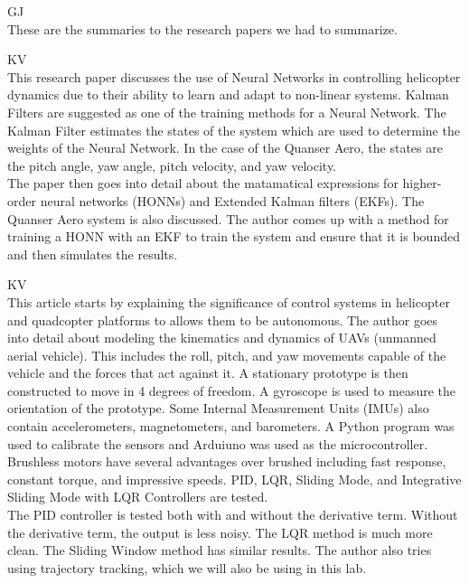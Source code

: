 \documentclass[fontsize=11pt, %
                             paper=letter, %
                             openany, %
                             captions=tableheading,
                             index=totoc,
                             hyperref]{labbook}
\begin{document}
\begin{addmargin}[0cm]{0cm}
GJ\\
These are the summaries to the research papers we had to summarize.


KV\\
This research paper \cite{Article1} discusses the use of Neural Networks in controlling helicopter dynamics due to their ability to learn and adapt to non-linear systems.  Kalman Filters are suggested as one of the training methods for a Neural Network.  The Kalman Filter estimates the states of the system which are used to determine the weights of the Neural Network.  In the case of the Quanser Aero, the states are the pitch angle, yaw angle, pitch velocity, and yaw velocity. 
\\The paper then goes into detail about the matamatical expressions for higher-order neural networks (HONNs) and Extended Kalman filters (EKFs).  The Quanser Aero system is also discussed.  The author comes up with a method for training a HONN with an EKF to train the system and ensure that it is bounded and then simulates the results.

KV\\
This article \cite{Article2} starts by explaining the significance of control systems in helicopter and quadcopter platforms to allows them to be autonomous.  The author goes into detail about modeling the kinematics and dynamics of UAVs (unmanned aerial vehicle). This includes the roll, pitch, and yaw movements capable of the vehicle and the forces that act against it.  A stationary prototype is then constructed to move in 4 degrees of freedom.  A gyroscope is used to measure the orientation of the prototype.  Some Internal Measurement Units (IMUs) also contain accelerometers, magnetometers, and barometers.  A Python program was used to calibrate the sensors and Arduiuno was used as the microcontroller.  Brushless motors have several advantages over brushed including fast response, constant torque, and impressive speeds.  PID, LQR, Sliding Mode, and Integrative Sliding Mode with LQR Controllers are tested.
\\The PID controller is tested both with and without the derivative term.  Without the derivative term, the output is less noisy.  The LQR method is much more clean.  The Sliding Window method has similar results.  The author also tries using trajectory tracking, which we will also be using in this lab.


\end{addmargin}
\end{document}
